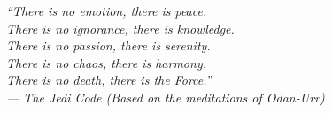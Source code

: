 %
%

\begin{epigrafe}

\textit{``There is no emotion, there is peace.\\
	There is no ignorance, there is knowledge.\\
	There is no passion, there is serenity.\\
	There is no chaos, there is harmony.\\
	There is no death, there is the Force.''\\
	--- The Jedi Code (Based on the meditations of Odan-Urr)}

\end{epigrafe}
